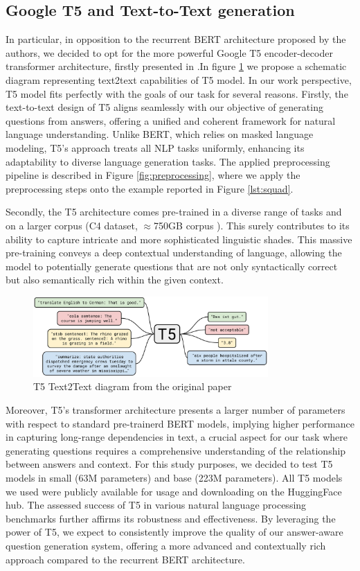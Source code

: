 \documentclass{article}
\begin{document}
\subsection{Google T5 and Text-to-Text generation}

In particular, in opposition to the recurrent BERT architecture proposed by the authors, we decided to opt for the more powerful Google T5 encoder-decoder transformer architecture, firstly presented in \cite{t5paper}.In figure \ref{fig:t5diagram} we propose a schematic diagram representing text2text capabilities of T5 model. In our work perspective, T5 model fits perfectly with the goals of our task for several reasons. 
Firstly, the text-to-text design of T5 aligns seamlessly with our objective of generating questions from answers, offering a unified and coherent framework for natural language understanding. Unlike BERT, which relies on masked language modeling, T5's approach treats all NLP tasks uniformly, enhancing its adaptability to diverse language generation tasks. The applied preprocessing pipeline is described in Figure \ref{fig:preprocessing}, where we apply the preprocessing steps onto the example reported in Figure \ref{lst:squad}.

Secondly, the T5 architecture comes pre-trained in a diverse range of tasks and on a larger corpus (C4 dataset, $\approx$750GB corpus \cite{t5paper}). This surely contributes to its ability to capture intricate and more sophisticated linguistic shades. This massive pre-training conveys a deep contextual understanding of language, allowing the model to potentially generate questions that are not only syntactically correct but also semantically rich within the given context.
\begin{figure}[hb]
    \centering
    \includegraphics[width=0.8\textwidth]{assets/t5.jpeg}
    \caption{T5 Text2Text diagram from the original paper}
    \label{fig:t5diagram}
\end{figure}
Moreover, T5's transformer architecture presents a larger number of parameters with respect to standard pre-trainerd BERT models, implying higher performance in capturing long-range dependencies in text, a crucial aspect for our task where generating questions requires a comprehensive understanding of the relationship between answers and context. For this study purposes, we decided to test T5 models in small (63M parameters) and base (223M parameters). All T5 models we used were publicly available for usage and downloading on the HuggingFace  hub.
The assessed success of T5 in various natural language processing benchmarks further affirms its robustness and effectiveness. By leveraging the power of T5, we expect to consistently improve the quality of our answer-aware question generation system, offering a more advanced and contextually rich approach compared to the recurrent BERT architecture. 
\end{document}
